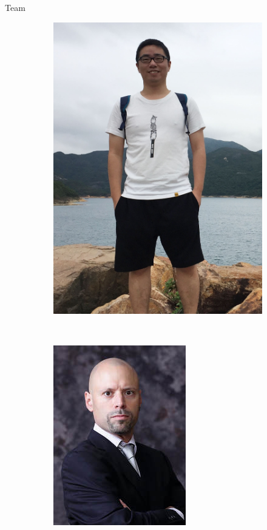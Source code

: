 \documentclass[aspectratio=169]{beamer}
\begin{document}
\begin{frame}{Team}
\begin{figure}
\begin{subfigure}[t]{0.3\textwidth}
           \includegraphics[scale=.076]{photo-jiaxi.jpg}
   \end{subfigure}
   ~~~
   \begin{subfigure}[t]{0.3\textwidth}
       \centering
           \includegraphics[scale=.48]{photo-daniel.jpg}
   \end{subfigure}
   \end{figure}
\end{frame}
\end{document}
